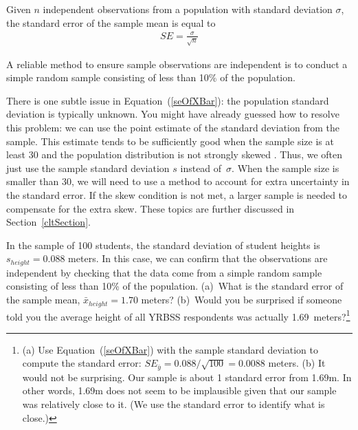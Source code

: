\begin{termBox}{
Given $n$ independent observations from a population with standard deviation $\sigma$, the standard error of the sample mean is equal to \vspace{-1mm}
\begin{eqnarray}
SE = \frac{\sigma}{\sqrt{n}}
\label{seOfXBar}
\end{eqnarray}\vspace{-3mm}%

A reliable method to ensure sample observations are independent is to conduct a simple random sample consisting of less than 10\% of the population.
}
\end{termBox}

There is one subtle issue in Equation~(\ref{seOfXBar}): the population standard deviation is typically unknown. You might have already guessed how to resolve this problem: we can use the point estimate of the standard deviation from the sample. This estimate tends to be sufficiently good when the sample size is at least 30 and the population distribution is not strongly skewed%
. Thus, we often just use the sample standard deviation $s$ instead of~$\sigma$. When the sample size is smaller than 30, we will need to use a method to account for extra uncertainty in the standard error. If the skew condition is not met, a larger sample is needed to compensate for the extra skew. These topics are further discussed in Section~\ref{cltSection}.

\begin{exercise}
In the sample of 100 students, the standard deviation of student heights is $s_{height} = 0.088$ meters. In this case, we can confirm that the observations are independent by checking that the data come from a simple random sample consisting of less than 10\% of the population. (a)~What is the standard error of the sample mean, $\bar{x}_{height} = 1.70$ meters? (b)~Would you be surprised if someone told you the average height of all YRBSS respondents was actually 1.69~meters?\footnote{(a) Use Equation~(\ref{seOfXBar}) with the sample standard deviation to compute the standard error: $SE_{\bar{y}} = 0.088 / \sqrt{100} = 0.0088$ meters. (b) It would not be surprising. Our sample is about 1 standard error from 1.69m. In other words, 1.69m does not seem to be implausible given that our sample was relatively close to it. (We use the standard error to identify what is close.)}
\end{exercise}

